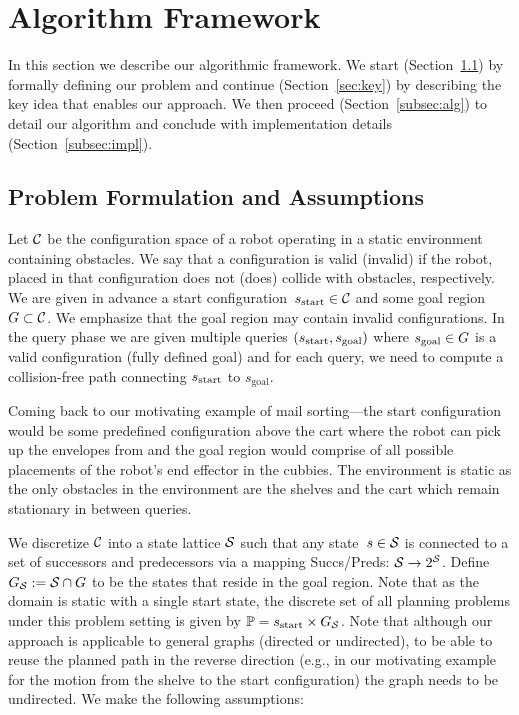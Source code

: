\documentclass[a4paper]{report}
\begin{document}
\section{Algorithm Framework}
\label{sec:alg}
In this section we describe our algorithmic framework. We start (Section~\ref{sec:pdef}) by formally defining our problem and continue (Section~\ref{sec:key}) by describing the key idea that enables our approach.
We then proceed (Section~\ref{subsec:alg}) to detail our algorithm and conclude with implementation details (Section~\ref{subsec:impl}).

\subsection{Problem Formulation and Assumptions}
\label{sec:pdef}
Let $\mathcal{C}$ be the configuration space of a robot operating in a static environment containing obstacles.
We say that a configuration is valid (invalid) if the robot, placed in that configuration does not (does) collide with obstacles, respectively.
We are given in advance a start configuration~$s_{\textrm{start}} \in \mathcal{C}$ and some goal region~$G \subset \mathcal{C}$.
We emphasize that the goal region may contain invalid configurations.
In the query phase we are given multiple queries $(s_{\textrm{start}}, s_{\text{goal}})$ where $s_{\rm goal} \in G$ is a valid configuration (fully defined goal) and for each query, we need to compute a collision-free path connecting $s_{\textrm{start}}$ to $s_{\text{goal}}$.

Coming back to our motivating example of mail sorting---the start configuration would be some predefined configuration above the cart where the robot can pick up the envelopes from and the goal region would comprise of all possible placements of the robot's end effector in the cubbies. The environment is static as the only obstacles in the environment are the shelves and the cart which remain stationary in between queries.

We discretize $\mathcal{C}$ into a state lattice $\mathcal{S}$ such that any state~$s \in \mathcal{S}$ is connected to a set of successors and predecessors via a mapping Succs/Preds: $\mathcal{S} \rightarrow 2^\mathcal{S}$.
Define $G_\mathcal{S} := \mathcal{S} \cap G$ to be the states that reside in the goal region.
Note that as the domain is static with a single start state, the discrete set of all planning problems under this problem setting is given by $\mathbb{P} = s_{\textrm{start}} \times G_\mathcal{S}$.
Note that although our approach is applicable to general graphs (directed or undirected), to be able to reuse the planned path in the reverse direction (e.g., in our motivating example for the motion from the shelve to the start configuration) the graph needs to be undirected.
We make the following assumptions:
\end{document}
